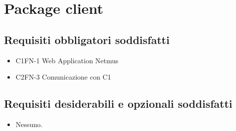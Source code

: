 \newpage
\section{Package client}
\subsection*{Requisiti obbligatori soddisfatti}
\begin{itemize}
	\item C1FN-1 Web Application Netmus
	\item C2FN-3 Comunicazione con C1
\end{itemize}
\subsection*{Requisiti desiderabili e opzionali soddisfatti}
\begin{itemize}
    \item Nessuno.
\end{itemize}
